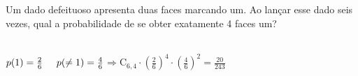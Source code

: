 \begin{ex}
Um dado defeituoso apresenta duas faces marcando um. Ao lançar esse dado seis vezes, qual a probabilidade de se obter exatamente 4 faces um?
  \begin{sol}
    \phantom{A} \\
    $p(1)=\frac{2}{6}\hspace{0,5cm} p(\neq1)=\frac{4}{6}$\hspace{0,3cm}$\Longrightarrow \mathrm{C}_{6,4}\cdot(\frac{2}{6})^4\cdot(\frac{4}{6})^2=\frac{20}{243}$
  \end{sol}
\end{ex}